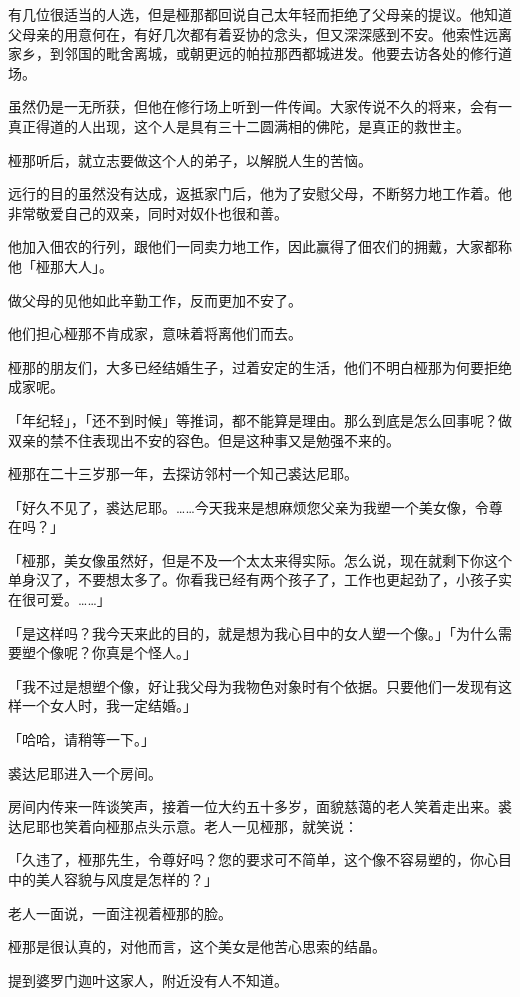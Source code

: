 \documentclass[twoside,openany]{book}
\begin{document}
有几位很适当的人选，但是桠那都回说自己太年轻而拒绝了父母亲的提议。他知道父母亲的用意何在，有好几次都有着妥协的念头，但又深深感到不安。他索性远离家乡，到邻国的毗舍离城，或朝更远的帕拉那西都城进发。他要去访各处的修行道场。

虽然仍是一无所获，但他在修行场上听到一件传闻。大家传说不久的将来，会有一真正得道的人出现，这个人是具有三十二圆满相的佛陀，是真正的救世主。

桠那听后，就立志要做这个人的弟子，以解脱人生的苦恼。

远行的目的虽然没有达成，返抵家门后，他为了安慰父母，不断努力地工作着。他非常敬爱自己的双亲，同时对奴仆也很和善。

他加入佃农的行列，跟他们一同卖力地工作，因此赢得了佃农们的拥戴，大家都称他「桠那大人」。

做父母的见他如此辛勤工作，反而更加不安了。

他们担心桠那不肯成家，意味着将离他们而去。

桠那的朋友们，大多已经结婚生子，过着安定的生活，他们不明白桠那为何要拒绝成家呢。

「年纪轻」，「还不到时候」等推词，都不能算是理由。那么到底是怎么回事呢？做双亲的禁不住表现出不安的容色。但是这种事又是勉强不来的。

桠那在二十三岁那一年，去探访邻村一个知己裘达尼耶。

「好久不见了，裘达尼耶。……今天我来是想麻烦您父亲为我塑一个美女像，令尊在吗？」

「桠那，美女像虽然好，但是不及一个太太来得实际。怎么说，现在就剩下你这个单身汉了，不要想太多了。你看我已经有两个孩子了，工作也更起劲了，小孩子实在很可爱。……」

「是这样吗？我今天来此的目的，就是想为我心目中的女人塑一个像。」「为什么需要塑个像呢？你真是个怪人。」

「我不过是想塑个像，好让我父母为我物色对象时有个依据。只要他们一发现有这样一个女人时，我一定结婚。」

「哈哈，请稍等一下。」

裘达尼耶进入一个房间。

房间内传来一阵谈笑声，接着一位大约五十多岁，面貌慈蔼的老人笑着走出来。裘达尼耶也笑着向桠那点头示意。老人一见桠那，就笑说：

「久违了，桠那先生，令尊好吗？您的要求可不简单，这个像不容易塑的，你心目中的美人容貌与风度是怎样的？」

老人一面说，一面注视着桠那的脸。

桠那是很认真的，对他而言，这个美女是他苦心思索的结晶。

提到婆罗门迦叶这家人，附近没有人不知道。
\end{document}
